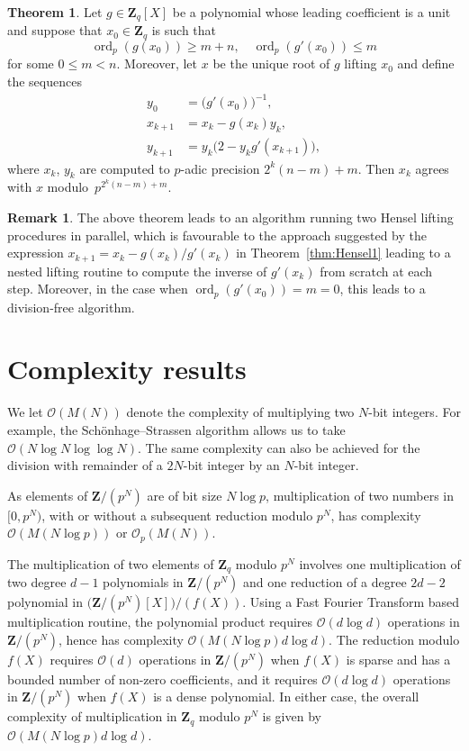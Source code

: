 \documentclass[a4paper,11pt]{article}
\theoremstyle{definition}
\newtheorem{thm}{Theorem}
\newtheorem{rem}{Remark}
\DeclareMathOperator{\ord}{ord}
\begin{document}
\begin{thm}
Let $g \in \mathbf{Z}_q[X]$ be a polynomial whose leading coefficient 
is a unit and suppose that $x_0 \in \mathbf{Z}_q$ is such that 
\begin{equation*}
\ord_p(g(x_0)) \geq m + n, \quad \ord_p(g'(x_0)) \leq m
\end{equation*}
for some $0 \leq m < n$.  Moreover, let $x$ be the unique root of $g$ 
lifting $x_0$ and define the sequences
\begin{align*}
y_0 & = \bigl( g'(x_0) \bigr)^{-1}, \\
x_{k+1} & = x_k - g(x_k) y_k, \\
y_{k+1} & = y_k \bigl( 2 - y_k g'(x_{k+1}) \bigr),
\end{align*}
where $x_k$, $y_k$ are computed to $p$-adic precision $2^k (n-m) + m$.
Then $x_k$ agrees with $x$ modulo~$p^{2^k (n - m) + m}$.
\end{thm}

\begin{rem}
The above theorem leads to an algorithm running two Hensel lifting 
procedures in parallel, which is favourable to the approach suggested 
by the expression $x_{k+1} = x_k - g(x_k) / g'(x_k)$ in 
Theorem~\ref{thm:Hensel1} leading to a nested lifting routine to 
compute the inverse of $g'(x_k)$ from scratch at each step.  Moreover, 
in the case when $\ord_p(g'(x_0)) = m = 0$, this leads to a division-free 
algorithm.
\end{rem}

\section{Complexity results}

We let $\mathcal{O}(M(N))$ denote the complexity of multiplying two 
$N$-bit integers.  For example, the Sch\"onhage--Strassen algorithm 
allows us to take $\mathcal{O}(N \log N \log \log N)$.  The same 
complexity can also be achieved for the division with remainder of 
a $2N$-bit integer by an $N$-bit integer.

As elements of $\mathbf{Z} / (p^N)$ are of bit size $N \log p$, 
multiplication of two numbers in $[0, p^N)$, with or without a subsequent 
reduction modulo $p^N$, has complexity $\mathcal{O}(M(N \log p))$ or 
$\mathcal{O}_p(M(N))$.

The multiplication of two elements of $\mathbf{Z}_q$ modulo $p^N$ 
involves one multiplication of two degree $d-1$ polynomials in 
$\mathbf{Z}/(p^N)$ and one reduction of a degree $2d - 2$ polynomial 
in $\bigl( \mathbf{Z}/(p^N)[X] \bigr) / (f(X))$.   Using a Fast Fourier 
Transform based multiplication routine, the polynomial product requires 
$\mathcal{O}(d \log d)$ operations in $\mathbf{Z}/(p^N)$, hence has 
complexity $\mathcal{O}(M(N \log p) d \log d)$.  The reduction modulo $f(X)$ 
requires $\mathcal{O}(d)$ operations in $\mathbf{Z}/(p^N)$ when $f(X)$ is 
sparse and has a bounded number of non-zero coefficients, and it requires 
$\mathcal{O}(d \log d)$ operations in $\mathbf{Z}/(p^N)$ when $f(X)$ is 
a dense polynomial.  In either case, the overall complexity of multiplication 
in $\mathbf{Z}_q$ modulo $p^N$ is given by $\mathcal{O}(M(N \log p) d \log d)$.
\end{document}
